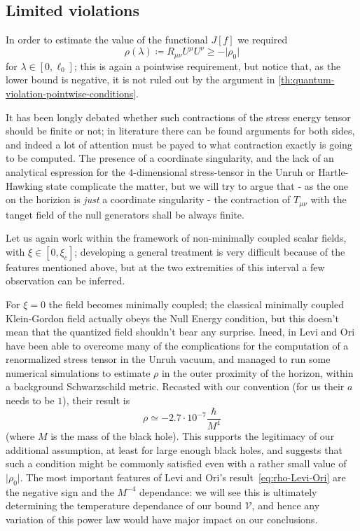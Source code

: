 \subsection{Limited violations}
\label{subsec:rho-0-estimation}

In order to estimate the value of the functional \(J[f]\) we required 
\[
	\rho (\lambda)\coloneqq R_{\mu\nu}U^{\mu}U^{\nu}\ge -\vert\rho_0\vert
\] 
for \(\lambda\in [0, \ell_0]\); this is again a pointwise requirement, but notice that, as the lower bound is negative, it is not ruled out by the argument in \ref{th:quantum-violation-pointwise-conditions}.

It has been longly debated whether such contractions of the stress energy tensor should be finite or not; in literature there can be found arguments for both sides, and indeed a lot of attention must be payed to what contraction exactly is going to be computed. The presence of a coordinate singularity, and the lack of an analytical espression for the \(4\)-dimensional stress-tensor in the Unruh or Hartle-Hawking state complicate the matter, but we will try to argue that - as the one on the horizion is \emph{just} a coordinate singularity - the contraction of \(T_{\mu\nu}\) with the tanget field of the null generators shall be always finite.

Let us again work within the framework of non-minimally coupled scalar fields, with \(\xi\in[0,\xi_c]\); developing a general treatment is very difficult because of the features mentioned above, but at the two extremities of this interval  a few observation can be inferred.

For \(\xi = 0\) the field becomes minimally coupled; the classical minimally coupled Klein-Gordon field actually obeys the Null Energy condition, but this doesn't mean that the quantized field shouldn't bear any surprise.
Ineed, in \cite{levi2016versatile} Levi and Ori have been able to overcome many of the complications for the computation of a renormalized stress tensor in the Unruh vacuum, and managed to run some numerical simulations to estimate \(\rho\) in the outer proximity of the horizon, within a background Schwarzschild metric. 
Recasted with our convention (for us their \(a\) needs to be \(1\)), their result is 
\begin{equation}
	\label{eq:rho-Levi-Ori}
	\rho \simeq -2.7\cdot 10^{-7} \frac{\hbar}{M^{4}} 
\end{equation}
(where \(M\) is the mass of the black hole). This supports the legitimacy of our additional assumption, at least for large enough black holes, and suggests that such a condition might be commonly satisfied even with a rather small value of \(\vert\rho_0\vert\). The most important features of Levi and Ori's result~\eqref{eq:rho-Levi-Ori} are the negative sign and the \(M^{-4}\) dependance: we will see this is ultimately determining the temperature dependance of our bound \(\mathcal{V}\), and hence any variation of this power law would have major impact on our conclusions.

